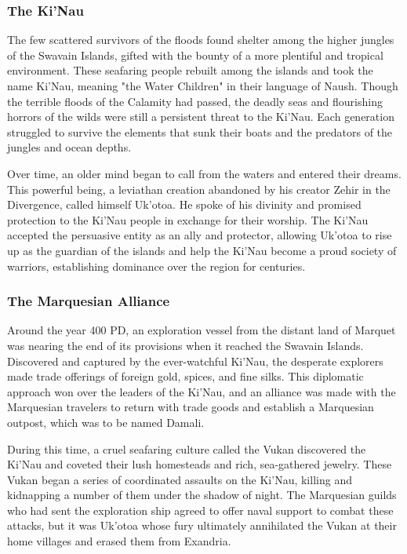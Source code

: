 \documentclass[10pt,a4paper,twoside,bg=print,twocolumn,openany,nodeprecatedcode]{dndbook}
\begin{document}
\subsubsection{The Ki'Nau}
The few scattered survivors of the floods found shelter among the higher jungles of the Swavain Islands, gifted with the bounty of a more plentiful and tropical environment. These seafaring people rebuilt among the islands and took the name Ki'Nau, meaning "the Water Children" in their language of Naush. Though the terrible floods of the Calamity had passed, the deadly seas and flourishing horrors of the wilds were still a persistent threat to the Ki'Nau. Each generation struggled to survive the elements that sunk their boats and the predators of the jungles and ocean depths.

Over time, an older mind began to call from the waters and entered their dreams. This powerful being, a leviathan creation abandoned by his creator Zehir in the Divergence, called himself Uk'otoa. He spoke of his divinity and promised protection to the Ki'Nau people in exchange for their worship. The Ki'Nau accepted the persuasive entity as an ally and protector, allowing Uk'otoa to rise up as the guardian of the islands and help the Ki'Nau become a proud society of warriors, establishing dominance over the region for centuries.

\subsubsection{The Marquesian Alliance}
Around the year 400 PD, an exploration vessel from the distant land of Marquet was nearing the end of its provisions when it reached the Swavain Islands. Discovered and captured by the ever-watchful Ki'Nau, the desperate explorers made trade offerings of foreign gold, spices, and fine silks. This diplomatic approach won over the leaders of the Ki'Nau, and an alliance was made with the Marquesian travelers to return with trade goods and establish a Marquesian outpost, which was to be named Damali.

During this time, a cruel seafaring culture called the Vukan discovered the Ki'Nau and coveted their lush homesteads and rich, sea-gathered jewelry. These Vukan began a series of coordinated assaults on the Ki'Nau, killing and kidnapping a number of them under the shadow of night. The Marquesian guilds who had sent the exploration ship agreed to offer naval support to combat these attacks, but it was Uk'otoa whose fury ultimately annihilated the Vukan at their home villages and erased them from Exandria.
\end{document}
